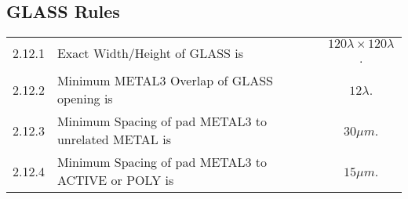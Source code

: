 \documentclass[10pt,a4paper,oneside]{article}
\newcounter{ct}
\begin{document}
\subsection{GLASS Rules}\label{design_rules_glass_rules}

\begin{flushleft}
    \begin{tabular}{c l c}
	2.12.1  & Exact Width/Height of GLASS is & $ 120 \lambda \times 120 \lambda$. \\
        2.12.2  & Minimum METAL3 Overlap of GLASS opening is & $ 12 \lambda $. \\
        2.12.3  & Minimum Spacing of pad METAL3 to unrelated METAL is & $30 \mu m$. \\
        2.12.4  & Minimum Spacing of pad METAL3 to ACTIVE or POLY is & $15 \mu m$. \\
    \end{tabular}
\end{flushleft}
\end{document}
